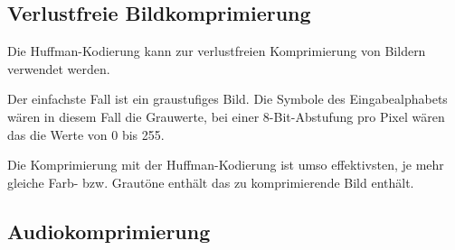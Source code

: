 \documentclass[twoside,11pt,a4paper]{article}
\theoremstyle{break}
\begin{document}
\subsection{Verlustfreie Bildkomprimierung}
Die Huffman-Kodierung kann zur verlustfreien Komprimierung von Bildern
verwendet werden.

Der einfachste Fall ist ein graustufiges Bild. Die Symbole des
Eingabealphabets wären in diesem Fall die Grauwerte, bei einer
8-Bit-Abstufung pro Pixel wären das die Werte von 0 bis 255.

Die Komprimierung mit der Huffman-Kodierung ist umso effektivsten, je
mehr gleiche Farb- bzw. Grautöne enthält das zu komprimierende Bild
enthält.

\subsection{Audiokomprimierung}

\renewcommand{\refname}{Literaturverzeichnis}


\end{document}

